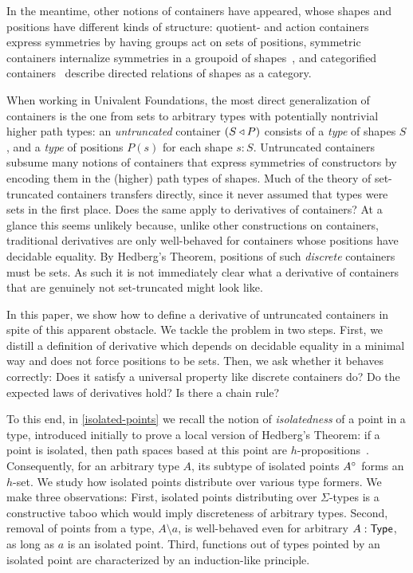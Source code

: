 In the meantime, other notions of containers have appeared,
whose shapes and positions have different kinds of structure:
quotient- \cite{AbbottEtAl2004ConstructingPolymorphicPrograms} and action containers~\cite{JoramVeltri2025DataTypesSymmetries}
express symmetries by having groups act on sets of positions,
symmetric containers internalize symmetries in a groupoid of shapes~\cite{Gylterud2011},
and categorified containers~\cite{AltenkirchKaposi2021containermodeltype} describe directed relations of shapes as a category.

When working in Univalent Foundations, the most direct generalization of containers is the one from sets to arbitrary types
with potentially nontrivial higher path types:
an \emph{untruncated} container \( (S\mathbin{\triangleleft}P) \) consists of a \emph{type} of shapes \( S \), and a \emph{type} of positions \( P(s) \) for each shape \( s : S \).
Untruncated containers subsume many notions of containers that express symmetries of constructors by encoding them in the (higher) path types of shapes.
Much of the theory of set-truncated containers transfers directly, since it never assumed that types were sets in the first place.
Does the same apply to derivatives of containers?
At a glance this seems unlikely because, unlike other constructions on containers,
traditional derivatives are only well-behaved for containers whose positions have decidable equality.
By Hedberg's Theorem, positions of such \emph{discrete} containers must be sets.
As such it is not immediately clear what a derivative of containers that are genuinely not set-truncated might look like.

In this paper, we show how to define a derivative of untruncated containers in spite of this apparent obstacle.
We tackle the problem in two steps.
First, we distill a definition of derivative which depends on decidable equality in a minimal way
and does not force positions to be sets.
Then, we ask whether it behaves correctly:
Does it satisfy a universal property like discrete containers do?
Do the expected laws of derivatives hold? Is there a chain rule?

To this end, in \autoref{isolated-points} we recall the notion of \emph{isolatedness} of a point in a type,
introduced initially to prove a local version of Hedberg's Theorem:
if a point is isolated, then path spaces based at this point are \( h \)-propositions~\cite{Palmgren2011Proofrelevancefamilies}.
Consequently, for an arbitrary type \( A \), its subtype of isolated points \( A^{\circ} \) forms an \( h \)-set.
We study how isolated points distribute over various type formers.
We make three observations:
First, isolated points distributing over \( \Sigma \)-types is a constructive taboo which would imply discreteness of arbitrary types.
Second, removal of points from a type, \( A \setminus a \), is well-behaved even for arbitrary \( A : \operatorname{\mathsf{Type}} \),
as long as \( a \) is an isolated point.
Third, functions out of types pointed by an isolated point are characterized by an induction-like principle.

